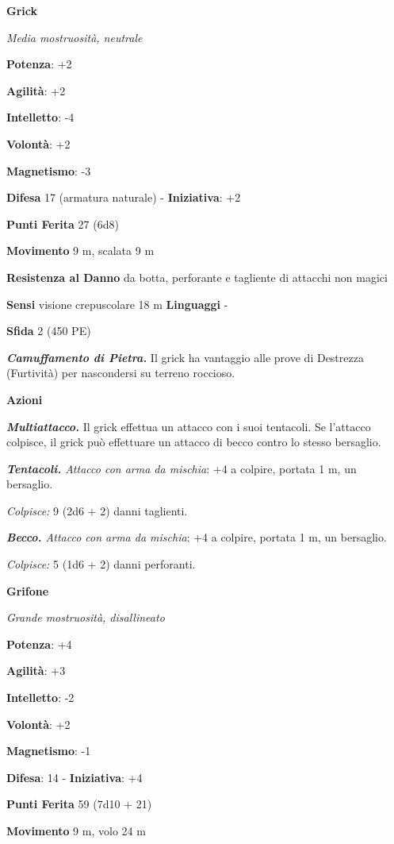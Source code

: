 \begin{multicols}{2}
\textbf{Grick}

\emph{Media mostruosità, neutrale}

\textbf{Potenza}: +2

\textbf{Agilità}: +2

\textbf{Intelletto}: -4

\textbf{Volontà}: +2

\textbf{Magnetismo}: -3

\textbf{Difesa} 17 (armatura naturale) - \textbf{Iniziativa}: +2

\textbf{Punti Ferita} 27 (6d8)

\textbf{Movimento} 9 m, scalata 9 m

\textbf{Resistenza al Danno} da botta, perforante e tagliente di
attacchi non magici

\textbf{Sensi} visione crepuscolare 18 m
\textbf{Linguaggi} -

\textbf{Sfida} 2 (450 PE)\smallskip

\emph{\textbf{Camuffamento di Pietra.}} Il grick ha vantaggio alle prove
di Destrezza (Furtività) per nascondersi su terreno roccioso.

\smallskip\textbf{Azioni}

\emph{\textbf{Multiattacco.}} Il grick effettua un attacco con i suoi
tentacoli. Se l'attacco colpisce, il grick può effettuare un attacco di
becco contro lo stesso bersaglio.

\emph{\textbf{Tentacoli.} Attacco con arma da mischia}: +4 a colpire,
portata 1 m, un bersaglio.

\emph{Colpisce:} 9 (2d6 + 2) danni taglienti.

\emph{\textbf{Becco.} Attacco con arma da mischia}: +4 a colpire,
portata 1 m, un bersaglio.

\emph{Colpisce:} 5 (1d6 + 2) danni perforanti.



\textbf{Grifone}

\emph{Grande mostruosità, disallineato}

\textbf{Potenza}: +4

\textbf{Agilità}: +3

\textbf{Intelletto}: -2

\textbf{Volontà}: +2

\textbf{Magnetismo}: -1

\textbf{Difesa}: 14 - \textbf{Iniziativa}: +4

\textbf{Punti Ferita} 59 (7d10 + 21)

\textbf{Movimento} 9 m, volo 24 m


\end{multicols}
